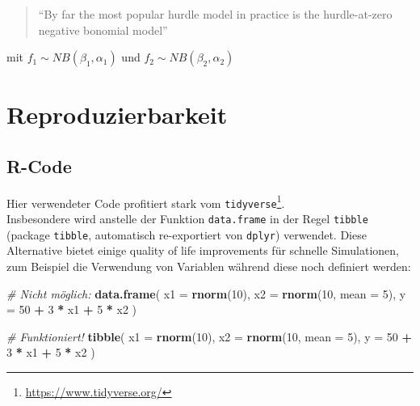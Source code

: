 \documentclass[ngerman,a4paper,]{scrartcl}
\newenvironment{Shaded}{\begin{snugshade}}{\end{snugshade}}
\newcommand{\CommentTok}[1]{\textcolor[rgb]{0.56,0.35,0.01}{\textit{#1}}}
\newcommand{\DataTypeTok}[1]{\textcolor[rgb]{0.13,0.29,0.53}{#1}}
\newcommand{\DecValTok}[1]{\textcolor[rgb]{0.00,0.00,0.81}{#1}}
\newcommand{\KeywordTok}[1]{\textcolor[rgb]{0.13,0.29,0.53}{\textbf{#1}}}
\newcommand{\NormalTok}[1]{#1}
\newcommand{\OperatorTok}[1]{\textcolor[rgb]{0.81,0.36,0.00}{\textbf{#1}}}
\newcommand{\StringTok}[1]{\textcolor[rgb]{0.31,0.60,0.02}{#1}}
\DeclareRobustCommand{\href}[2]{#2\footnote{\url{#1}}}
\theoremstyle{definition}
\theoremstyle{definition}
\theoremstyle{definition}
\theoremstyle{remark}
\begin{document}
\begin{quote}
\enquote{By far the most popular hurdle model in practice is the hurdle-at-zero negative bonomial model}
\citep[p.~183]{winkelmannEconometricAnalysisCount2010}
\end{quote}

mit \(f_1 \sim NB(\beta_1, \alpha_1)\) und \(f_2 \sim NB(\beta_2, \alpha_2)\)

\hypertarget{repro}{%
\section{Reproduzierbarkeit}\label{repro}}

\hypertarget{r-code}{%
\subsection{R-Code}\label{r-code}}

Hier verwendeter Code profitiert stark vom \href{https://www.tidyverse.org/}{\texttt{tidyverse}}.\\
Insbesondere wird anstelle der Funktion \texttt{data.frame} in der Regel \texttt{tibble} (package \texttt{tibble}, automatisch re-exportiert von \texttt{dplyr}) verwendet. Diese Alternative bietet einige quality of life improvements für schnelle Simulationen, zum Beispiel die Verwendung von Variablen während diese noch definiert werden:

\begin{Shaded}
\begin{Highlighting}[]
\CommentTok{# Nicht möglich:}
\KeywordTok{data.frame}\NormalTok{(}
   \DataTypeTok{x1 =} \KeywordTok{rnorm}\NormalTok{(}\DecValTok{10}\NormalTok{),}
   \DataTypeTok{x2 =} \KeywordTok{rnorm}\NormalTok{(}\DecValTok{10}\NormalTok{, }\DataTypeTok{mean =} \DecValTok{5}\NormalTok{),}
   \DataTypeTok{y =} \DecValTok{50} \OperatorTok{+}\StringTok{ }\DecValTok{3} \OperatorTok{*}\StringTok{ }\NormalTok{x1 }\OperatorTok{+}\StringTok{ }\DecValTok{5} \OperatorTok{*}\StringTok{ }\NormalTok{x2}
\NormalTok{)}

\CommentTok{# Funktioniert!}
\KeywordTok{tibble}\NormalTok{(}
   \DataTypeTok{x1 =} \KeywordTok{rnorm}\NormalTok{(}\DecValTok{10}\NormalTok{),}
   \DataTypeTok{x2 =} \KeywordTok{rnorm}\NormalTok{(}\DecValTok{10}\NormalTok{, }\DataTypeTok{mean =} \DecValTok{5}\NormalTok{),}
   \DataTypeTok{y =} \DecValTok{50} \OperatorTok{+}\StringTok{ }\DecValTok{3} \OperatorTok{*}\StringTok{ }\NormalTok{x1 }\OperatorTok{+}\StringTok{ }\DecValTok{5} \OperatorTok{*}\StringTok{ }\NormalTok{x2}
\NormalTok{)}
\end{Highlighting}
\end{Shaded}
\end{document}

